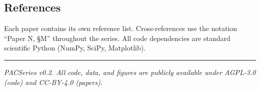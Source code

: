 \documentclass[
  11pt,
  a4paper]{article}
\begin{document}
\subsection{References}\label{references}

Each paper contains its own reference list. Cross-references use the
notation ``Paper N, §M'' throughout the series. All code dependencies
are standard scientific Python (NumPy, SciPy, Matplotlib).

\begin{center}\rule{0.5\linewidth}{0.5pt}\end{center}

\emph{PACSeries v0.2. All code, data, and figures are publicly available
under AGPL-3.0 (code) and CC-BY-4.0 (papers).}
\end{document}
